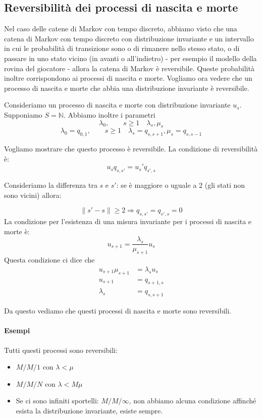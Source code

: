 \documentclass[a4paper,12pt]{book}
\begin{document}
\subsection{Reversibilità dei processi di nascita e morte}
Nel caso delle catene di Markov con tempo discreto, abbiamo visto che una catena di Markov con tempo discreto con distribuzione invariante e un intervallo in cui le probabilità di transizione sono o di rimanere nello stesso stato, o di passare in uno stato vicino (in avanti o all'indietro) - per esempio il modello della rovina del giocatore - allora la catena di Markov è reversibile. Queste probabilità inoltre corrispondono ai processi di nascita e morte. Vogliamo ora vedere che un processo di nascita e morte che abbia una distribuzione invariante è reversibile. 

Consideriamo un processo di nascita e morte con distribuzione invariante $ u_s $. Supponiamo $ S = \mathbb{N} $. Abbiamo inoltre i parametri
$$ \lambda_0, \qquad s \ge 1 \quad \lambda_s, \mu_s $$
$$ \lambda_0 = q_{0,1}, \qquad s \ge 1 \quad \lambda_s = q_{s,s+1}, \mu_s = q_{s,s-1} $$

Vogliamo mostrare che questo processo è reversibile.
La condizione di reversibilità è:
$$ u_s q_{s,s'} = u_s' q_{s',s} $$

Consideriamo la differenza tra $ s $ e $ s' $: se è maggiore o uguale a 2 (gli stati non sono vicini) allora:

$$ \parallel s' - s \parallel \ge 2 \Rightarrow q_{s,s'} = q_{s',s} = 0 $$
La condizione per l'esistenza di una misura invariante per i processi di nascita e morte è:
$$ u_{s+1} = \frac{\lambda_s}{ \mu_{s+1}} u_s$$
Questa condizione ci dice che 
\begin{align*}
	u_{s+1} \mu_{s+1} & = \lambda_s u_s \\
	u_{s+1} & = q_{s+1,s} \\
	\lambda_s & = q_{s,s+1}
\end{align*}

Da questo vediamo che questi processi di nascita e morte sono reversibili. 

\paragraph{Esempi} 
Tutti questi processi sono reversibili:
\begin{itemize}
	\item $ M/M/1 $ con $\lambda < \mu$
	\item $ M/M/N $ con $\lambda < M\mu$
	\item Se ci sono infiniti sportelli: $ M/M/\infty $, non abbiamo alcuna condizione affinché esista la distribuzione invariante, esiste sempre.
\end{itemize} 
\end{document}

